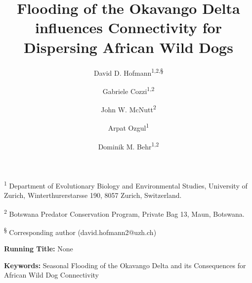 \documentclass[abstract=on,10pt,a4paper,bibliography=totocnumbered]{article}
\title{Flooding of the Okavango Delta influences Connectivity for Dispersing
African Wild Dogs}
\author{
  David D. Hofmann\textsuperscript{1,2,\S} \orcid{0000-0003-3477-4365} \and
  Gabriele Cozzi\textsuperscript{1,2} \orcid{0000-0002-1744-1940} \and
  John W. McNutt\textsuperscript{2} \and
  Arpat Ozgul\textsuperscript{1} \orcid{0000-0001-7477-2642} \and
  Dominik M. Behr\textsuperscript{1,2} \orcid{0000-0001-7378-8538}
}
\begin{document}



\maketitle

\begin{flushleft}

\vspace{0.5cm}

\textsuperscript{1} Department of Evolutionary Biology and Environmental
Studies, University of Zurich, Winterthurerstarsse 190, 8057 Zurich,
Switzerland.

\textsuperscript{2} Botswana Predator Conservation Program, Private Bag 13,
Maun, Botswana.

\textsuperscript{\S} Corresponding author (david.hofmann2@uzh.ch)

\vspace{4cm}

\textbf{Running Title:} None

\vspace{0.5cm}

\textbf{Keywords:} Seasonal Flooding of the Okavango Delta and its Consequences
for African Wild Dog Connectivity

\end{flushleft}
\end{document}
